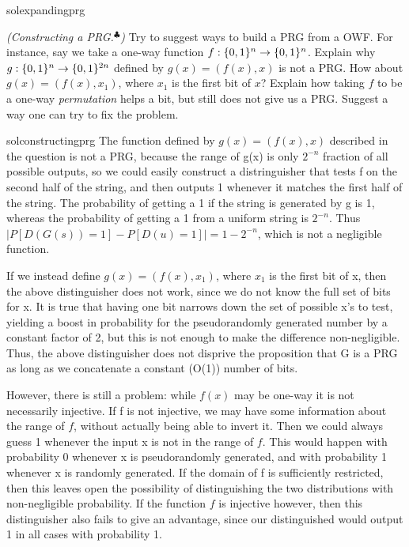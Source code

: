 \begin{questions}
{\begin{mysolution}{solexpandingprg}
    \end{mysolution}
}

  \question[2] 
	\emph{(Constructing a PRG.$^\clubsuit$)} Try to suggest ways to build a PRG from a OWF. 
    For instance, say we take a one-way function $f:\{{0,1}\}^n \to \{{0,1}\}^n$. Explain why $g:\{{0,1}\}^n \to \{{0,1}\}^{2n}$ defined by $g(x)=(f(x),x)$ is not a PRG.
		How about $g(x)=(f(x),x_1)$, where $x_1$ is the first bit of $x$? Explain how taking $f$ to be a one-way \emph{permutation} helps a bit, but still does not give us a PRG. Suggest a way one can try to fix the problem. 
    \begin{mysolution}{solconstructingprg}
      The function defined by $g(x) = (f(x),x)$ described in the question is not a PRG, because the range of g(x) is only $2^{-n}$ fraction of all possible outputs, so we could easily construct a distringuisher that tests f on the second half of the string, and then outputs 1 whenever it matches the first half of the string. The probability of getting a 1 if the string is generated by g is 1, whereas the probability of getting a 1 from a uniform string is $2^{-n}$. Thus $|P[D(G(s))=1] - P[D(u)=1]| = 1-2^{-n}$, which is not a negligible function.
      
      If we instead define $g(x) = (f(x), x_1)$, where $x_1$ is the first bit of x, then the above distinguisher does not work, since we do not know the full set of bits for x. It is true that having one bit narrows down the set of possible x's to test, yielding a boost in probability for the pseudorandomly generated number by a constant factor of 2, but this is not enough to make the difference non-negligible. Thus, the above distinguisher does not disprive the proposition that G is a PRG as long as we concatenate a constant (O(1)) number of bits.
      
       However, there is still a problem: while $f(x)$ may be one-way it is not necessarily injective. If f is not injective, we may have some information about the range of $f$, without actually being able to invert it. Then we could always guess 1 whenever the input x is not in the range of $f$. This would happen with probability 0 whenever x is pseudorandomly generated, and with probability 1 whenever x is randomly generated. If the domain of f is sufficiently restricted, then this leaves open the possibility of distinguishing the two distributions with non-negligible probability. If the function $f$ is injective however, then this distinguisher also fails to give an advantage, since our distinguished would output 1 in all cases with probability 1. 
      

\end{mysolution}
\end{questions}
